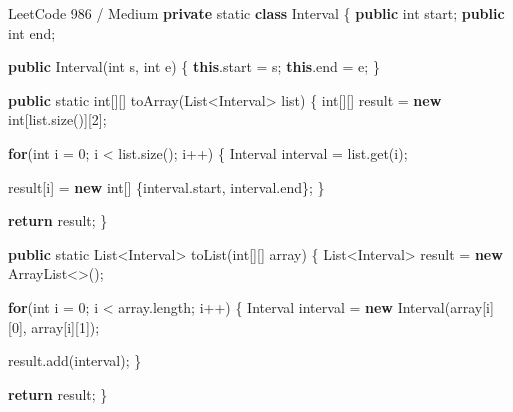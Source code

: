 \documentclass[]{book}
\newenvironment{Shaded}{\begin{snugshade}}{\end{snugshade}}
\newcommand{\BuiltInTok}[1]{#1}
\newcommand{\DataTypeTok}[1]{\textcolor[rgb]{0.13,0.29,0.53}{#1}}
\newcommand{\DecValTok}[1]{\textcolor[rgb]{0.00,0.00,0.81}{#1}}
\newcommand{\FunctionTok}[1]{\textcolor[rgb]{0.00,0.00,0.00}{#1}}
\newcommand{\KeywordTok}[1]{\textcolor[rgb]{0.13,0.29,0.53}{\textbf{#1}}}
\newcommand{\NormalTok}[1]{#1}
\begin{document}
\begin{Shaded}
\begin{Highlighting}[]
\NormalTok{LeetCode }\DecValTok{986}\NormalTok{ / Medium}
\KeywordTok{private} \DataTypeTok{static} \KeywordTok{class}\NormalTok{ Interval \{}
    \KeywordTok{public} \DataTypeTok{int}\NormalTok{ start;}
    \KeywordTok{public} \DataTypeTok{int}\NormalTok{ end;}

    \KeywordTok{public} \FunctionTok{Interval}\NormalTok{(}\DataTypeTok{int}\NormalTok{ s, }\DataTypeTok{int}\NormalTok{ e) \{}
        \KeywordTok{this}\NormalTok{.}\FunctionTok{start}\NormalTok{ = s;}
        \KeywordTok{this}\NormalTok{.}\FunctionTok{end}\NormalTok{ = e;}
\NormalTok{    \}}

    \KeywordTok{public} \DataTypeTok{static} \DataTypeTok{int}\NormalTok{[][] }\FunctionTok{toArray}\NormalTok{(}\BuiltInTok{List}\NormalTok{<Interval> list) \{}
        \DataTypeTok{int}\NormalTok{[][] result = }\KeywordTok{new} \DataTypeTok{int}\NormalTok{[list.}\FunctionTok{size}\NormalTok{()][}\DecValTok{2}\NormalTok{];}

        \KeywordTok{for}\NormalTok{(}\DataTypeTok{int}\NormalTok{ i = }\DecValTok{0}\NormalTok{; i < list.}\FunctionTok{size}\NormalTok{(); i++) \{}
\NormalTok{            Interval interval = list.}\FunctionTok{get}\NormalTok{(i);}

\NormalTok{            result[i] = }\KeywordTok{new} \DataTypeTok{int}\NormalTok{[] \{interval.}\FunctionTok{start}\NormalTok{, interval.}\FunctionTok{end}\NormalTok{\};}
\NormalTok{        \}}

        \KeywordTok{return}\NormalTok{ result;}
\NormalTok{    \}}

    \KeywordTok{public} \DataTypeTok{static} \BuiltInTok{List}\NormalTok{<Interval> }\FunctionTok{toList}\NormalTok{(}\DataTypeTok{int}\NormalTok{[][] array) \{}
        \BuiltInTok{List}\NormalTok{<Interval> result = }\KeywordTok{new} \BuiltInTok{ArrayList}\NormalTok{<>();}

        \KeywordTok{for}\NormalTok{(}\DataTypeTok{int}\NormalTok{ i = }\DecValTok{0}\NormalTok{; i < array.}\FunctionTok{length}\NormalTok{; i++) \{}
\NormalTok{            Interval interval = }\KeywordTok{new} \FunctionTok{Interval}\NormalTok{(array[i][}\DecValTok{0}\NormalTok{], array[i][}\DecValTok{1}\NormalTok{]);}

\NormalTok{            result.}\FunctionTok{add}\NormalTok{(interval);}
\NormalTok{        \}}

        \KeywordTok{return}\NormalTok{ result;}
\NormalTok{    \}}


\end{Highlighting}
\end{Shaded}
\end{document}
